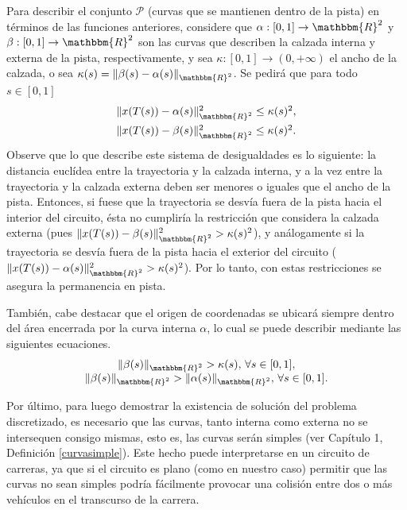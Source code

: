 \documentclass[a4paper,10pt]{book}
\newcommand{\R}{\mathbbm{R}}
\newcommand{\arr}{\rightarrow}
\begin{document}
Para describir el conjunto $\mathcal{P}$ (curvas que se mantienen dentro de la pista) en t\'erminos de las funciones anteriores, considere que $\alpha:[0,1]\arr\R^2$ y $\beta:[0,1]\arr\R^2$ son las curvas que describen la calzada interna y externa de la pista, respectivamente, y sea $\kappa:[0,1]\arr(0,+\infty)$ el ancho de la calzada, o sea $\kappa(s)=\|\beta(s)-\alpha(s)\|_{\R^2}$. Se pedirá que para todo $s\in[0,1]$
\begin{equation}\label{pista2}
\begin{array}{c}
 \|x(T(s))-\alpha(s)\|_{\R^2}^2 \leq \kappa(s)^2,\\[2mm]
 \|x(T(s))-\beta(s)\|_{\R^2}^2 \leq \kappa(s)^2.
\end{array}
\end{equation}
Observe que lo que describe este sistema de desigualdades es lo siguiente: la distancia euclídea entre la trayectoria y la calzada interna, y a la vez entre la trayectoria y la calzada externa deben ser menores o iguales que el ancho de la pista. Entonces, si fuese que la trayectoria se desvía fuera de la pista hacia el interior del circuito, \'esta no cumpliría la restricción que considera la calzada externa (pues $\|x(T(s))-\beta(s)\|_{\R^2}^2 > \kappa(s)^2$), y análogamente si la trayectoria se desvía fuera de la pista hacia el exterior del circuito ($\|x(T(s))-\alpha(s)\|_{\R^2}^2 > \kappa(s)^2$).
Por lo tanto, con estas restricciones se asegura la permanencia en pista.

También, cabe destacar que el origen de coordenadas se ubicará siempre dentro del área encerrada por la curva interna $\alpha$, lo cual se puede describir mediante las siguientes ecuaciones.
\begin{equation*}
    \begin{array}{c}
         \|\beta(s)\|_{\R^2}>\kappa(s),\,\forall s\in[0,1],\\
         \|\beta(s)\|_{\R^2}>\|\alpha(s)\|_{\R^2},\,\forall s\in[0,1].
    \end{array}
\end{equation*}

Por último, para luego demostrar la existencia de solución del problema discretizado, es necesario que las curvas, tanto interna como externa no se intersequen consigo mismas, esto es, las curvas serán simples (ver Capítulo 1, Definición \ref{curvasimple}). Este hecho puede interpretarse en un circuito de carreras, ya que si el circuito es plano (como en nuestro caso) permitir que las curvas no sean simples podría fácilmente provocar una colisión entre dos o más vehículos en el transcurso de la carrera.
\end{document}
